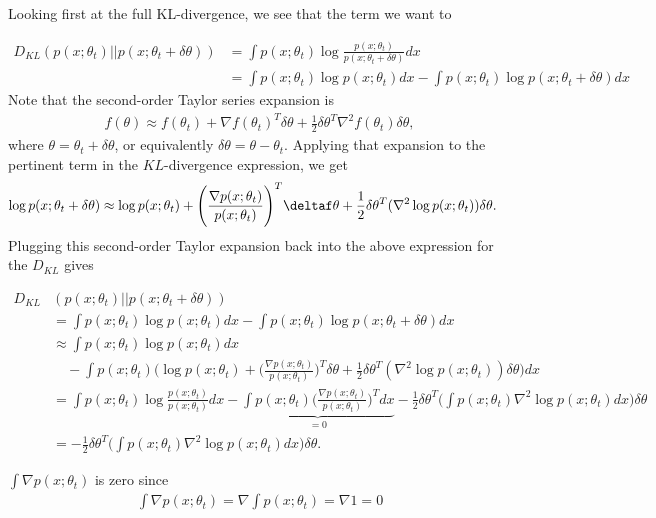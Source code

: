 Looking first at the full KL-divergence, we see that the term we want to 

\begin{align*}
	D_{KL}(p(x;\theta_t)||p(x;\theta_t+\delta \theta)) &= \int p(x;\theta_t)\log \frac{p(x;\theta_t)}{p(x;\theta_t+\delta \theta)} dx\\
	&= \int p(x;\theta_t)\log p(x;\theta_t) dx - \int p(x;\theta_t)\log p(x;\theta_t+\delta \theta) dx
\end{align*}
Note that the second-order Taylor series expansion is
\begin{align*}
	f(\theta) \approx f(\theta_t) + \nabla f(\theta_t)^T\delta\theta + \frac{1}{2} \delta\theta^T\nabla^2f(\theta_t)\delta\theta,
\end{align*}
where $\theta=\theta_t+\delta\theta$, or equivalently $\delta\theta = \theta-\theta_t$. Applying that expansion to the pertinent term in the $KL$-divergence expression, we get
\begin{align*}
	\log p(x;\theta_t+\delta \theta) &\approx \log p(x;\theta_t) + \Bigg(\frac{\nabla p(x;\theta_t)}{p(x;\theta_t)}\Bigg)^T \deltaf\theta + \frac{1}{2}\delta\theta^T (\nabla^2 \log p(x;\theta_t))\delta\theta.
\end{align*}
Plugging this second-order Taylor expansion back into the above expression for the $D_{KL}$ gives

\begin{align*}
	D_{KL}&(p(x;\theta_t)||p(x;\theta_t+\delta \theta))\\ &= \int p(x;\theta_t)\log p(x;\theta_t) dx - \int p(x;\theta_t)\log p(x;\theta_t+\delta \theta) dx\\
	&\approx \int p(x;\theta_t)\log p(x;\theta_t) dx\\
	&\quad - \int p(x;\theta_t)\Bigg(\log p(x;\theta_t) + \Bigg(\frac{\nabla p(x;\theta_t)}{p(x;\theta_t)}\Bigg)^T \delta \theta + \frac{1}{2}\delta\theta^T (\nabla^2 \log p(x;\theta_t))\delta\theta \Bigg)dx\\
	&=\int p(x;\theta_t)\log\frac{ p(x;\theta_t)}{p(x;\theta_t)} dx - \underbrace{\int p(x;\theta_t)\Bigg(\frac{\nabla p(x;\theta_t)}{p(x;\theta_t)}\Bigg)^T dx }_{=0} - \frac{1}{2}\delta\theta^T\Bigg(\int p(x;\theta_t) \nabla^2 \log p(x;\theta_t) dx\Bigg) \delta\theta\\
	&= -\frac{1}{2}\delta\theta^T\Bigg(\int p(x;\theta_t) \nabla^2 \log p(x;\theta_t) dx\Bigg) \delta\theta.
\end{align*}

$\int \nabla p(x;\theta_t)$ is zero since 
\begin{align*}
\int \nabla p(x;\theta_t) = \nabla\int  p(x;\theta_t) = \nabla 1 = 0
\end{align*} 

